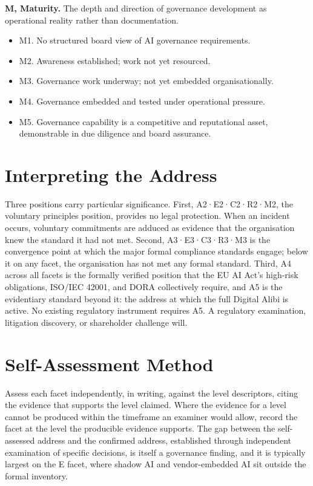 \textbf{M, Maturity.} The depth and direction of governance development as operational reality rather than documentation.

\begin{itemize}
\tightlist
\item
  M1. No structured board view of AI governance requirements.
\item
  M2. Awareness established; work not yet resourced.
\item
  M3. Governance work underway; not yet embedded organisationally.
\item
  M4. Governance embedded and tested under operational pressure.
\item
  M5. Governance capability is a competitive and reputational asset, demonstrable in due diligence and board assurance.
\end{itemize}

\section{Interpreting the Address}

Three positions carry particular significance. First, A2·E2·C2·R2·M2, the voluntary principles position, provides no legal protection. When an incident occurs, voluntary commitments are adduced as evidence that the organisation knew the standard it had not met. Second, A3·E3·C3·R3·M3 is the convergence point at which the major formal compliance standards engage; below it on any facet, the organisation has not met any formal standard. Third, A4 across all facets is the formally verified position that the EU AI Act's high-risk obligations, ISO/IEC 42001, and DORA collectively require, and A5 is the evidentiary standard beyond it: the address at which the full Digital Alibi is active. No existing regulatory instrument requires A5. A regulatory examination, litigation discovery, or shareholder challenge will.

\section{Self-Assessment Method}

Assess each facet independently, in writing, against the level descriptors, citing the evidence that supports the level claimed. Where the evidence for a level cannot be produced within the timeframe an examiner would allow, record the facet at the level the producible evidence supports. The gap between the self-assessed address and the confirmed address, established through independent examination of specific decisions, is itself a governance finding, and it is typically largest on the E facet, where shadow AI and vendor-embedded AI sit outside the formal inventory.
